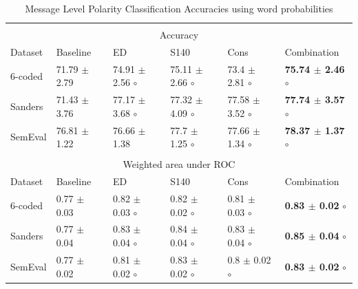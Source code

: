 \documentclass{sig-alternate}
\begin{document}
\begin{table}[htbp]

\begin{center}
\begin{tabular}{|l|l|l|l|l|l|}
\hline
\multicolumn{ 6}{|c|}{} \\ 
\multicolumn{ 6}{|c|}{Accuracy } \\ \hline
Dataset & Baseline & ED & S140 & Cons & Combination \\ \hline
6-coded & 71.79 $\pm$ 2.79 & 74.91 $\pm$ 2.56 $\circ$ & 75.11 $\pm$ 2.66 $\circ$ & 73.4 $\pm$ 2.81 $\circ$ & \textbf{75.74 $\pm$ 2.46} $\circ$ \\ 
Sanders & 71.43 $\pm$ 3.76 & 77.17 $\pm$ 3.68 $\circ$ & 77.32 $\pm$ 4.09 $\circ$ & 77.58 $\pm$ 3.52 $\circ$ & \textbf{77.74 $\pm$ 3.57} $\circ$ \\ 
SemEval & 76.81 $\pm$ 1.22 & 76.66 $\pm$ 1.38 & 77.7 $\pm$ 1.25 $\circ$ & 77.66 $\pm$ 1.34 $\circ$ & \textbf{78.37 $\pm$ 1.37} $\circ$ \\ \hline
\multicolumn{ 6}{|c|}{} \\ 
\multicolumn{ 6}{|c|}{Weighted area under ROC } \\ \hline
Dataset & Baseline & ED & S140 & Cons & Combination \\ \hline
6-coded & 0.77 $\pm$ 0.03 & 0.82 $\pm$ 0.03 $\circ$ & 0.82 $\pm$ 0.02 $\circ$ & 0.81 $\pm$ 0.03 $\circ$ & \textbf{0.83 $\pm$ 0.02} $\circ$ \\ 
Sanders & 0.77 $\pm$ 0.04 & 0.83 $\pm$ 0.04 $\circ$ & 0.84 $\pm$ 0.04 $\circ$ & 0.83 $\pm$ 0.04 $\circ$ & \textbf{0.85 $\pm$ 0.04} $\circ$ \\ 
SemEval & 0.77 $\pm$ 0.02 & 0.81 $\pm$ 0.02 $\circ$ & 0.83 $\pm$ 0.02 $\circ$ & 0.8 $\pm$ 0.02 $\circ$ & \textbf{0.83 $\pm$ 0.02} $\circ$ \\ \hline
\end{tabular}
\caption{Message Level Polarity Classification Accuracies using word probabilities}
\end{center}
\label{}
\end{table}
\end{document}
